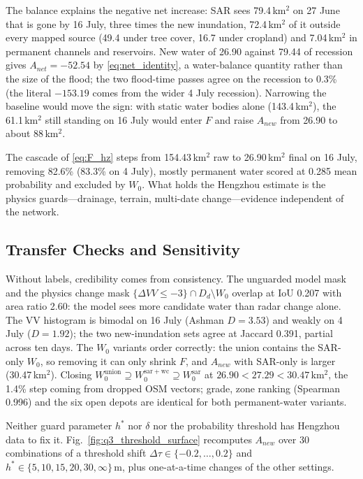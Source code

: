 The balance explains the negative net increase: SAR sees 79.4\,km$^2$ on 27 June that is gone by 16 July, three times the new inundation, 72.4\,km$^2$ of it outside every mapped source (49.4 under tree cover, 16.7 under cropland) and 7.04\,km$^2$ in permanent channels and reservoirs. New water of 26.90 against 79.44 of recession gives $A_{net}=-52.54$ by \eqref{eq:net_identity}, a water-balance quantity rather than the size of the flood; the two flood-time passes agree on the recession to 0.3\% (the literal $-153.19$ comes from the wider 4 July recession). Narrowing the baseline would move the sign: with static water bodies alone (143.4\,km$^2$), the 61.1\,km$^2$ still standing on 16 July would enter $F$ and raise $A_{new}$ from 26.90 to about 88\,km$^2$.

The cascade of \eqref{eq:F_hz} steps from 154.43\,km$^2$ raw to 26.90\,km$^2$ final on 16 July, removing 82.6\% (83.3\% on 4 July), mostly permanent water scored at 0.285 mean probability and excluded by $W_0$. What holds the Hengzhou estimate is the physics guards---drainage, terrain, multi-date change---evidence independent of the network.

\subsection{Transfer Checks and Sensitivity}

Without labels, credibility comes from consistency. The unguarded model mask and the physics change mask $\{\Delta VV\le-3\}\cap D_d\setminus W_0$ overlap at IoU 0.207 with area ratio 2.60: the model sees more candidate water than radar change alone. The VV histogram is bimodal on 16 July (Ashman $D=3.53$) and weakly on 4 July ($D=1.92$); the two new-inundation sets agree at Jaccard 0.391, partial across ten days. The $W_0$ variants order correctly: the union contains the SAR-only $W_0$, so removing it can only shrink $F$, and $A_{new}$ with SAR-only is larger (30.47\,km$^2$). Closing $W_0^{\mathrm{union}}\supseteq W_0^{\mathrm{sar+wc}}\supseteq W_0^{\mathrm{sar}}$ at $26.90<27.29<30.47$\,km$^2$, the 1.4\% step coming from dropped OSM vectors; grade, zone ranking (Spearman 0.996) and the six open depots are identical for both permanent-water variants.

Neither guard parameter $h^*$ nor $\delta$ nor the probability threshold has Hengzhou data to fix it. Fig.~\ref{fig:q3_threshold_surface} recomputes $A_{new}$ over 30 combinations of a threshold shift $\Delta\tau\in\{-0.2,\dots,0.2\}$ and $h^*\in\{5,10,15,20,30,\infty\}$\,m, plus one-at-a-time changes of the other settings.

